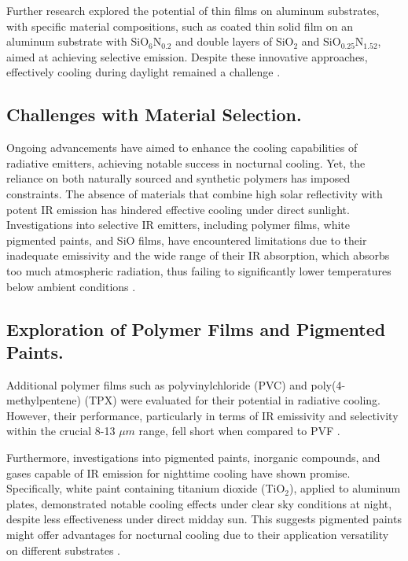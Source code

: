 Further research explored the potential of thin films on aluminum substrates, with specific material compositions, such as coated thin solid film on an aluminum substrate with $\text{SiO}_6\text{N}_{0.2}$ and double layers of $\text{SiO}_2$ and $\text{SiO}_{0.25}\text{N}_{1.52}$, aimed at achieving selective emission. Despite these innovative approaches, effectively cooling during daylight remained a challenge \cite{bijarniya_review_2020}.

\subsection{Challenges with Material Selection.}
Ongoing advancements have aimed to enhance the cooling capabilities of radiative emitters, achieving notable success in nocturnal cooling. Yet, the reliance on both naturally sourced and synthetic polymers has imposed constraints. The absence of materials that combine high solar reflectivity with potent IR emission has hindered effective cooling under direct sunlight. Investigations into selective IR emitters, including polymer films, white pigmented paints, and SiO films, have encountered limitations due to their inadequate emissivity and the wide range of their IR absorption, which absorbs too much atmospheric radiation, thus failing to significantly lower temperatures below ambient conditions \cite{hossain_radiative_2016}.

\subsection{Exploration of Polymer Films and Pigmented Paints.}
Additional polymer films such as polyvinylchloride (PVC) and poly(4-methylpentene) (TPX) were evaluated for their potential in radiative cooling. However, their performance, particularly in terms of IR emissivity and selectivity within the crucial 8-13 $\mu m$ range, fell short when compared to PVF \cite{hossain_radiative_2016}.

Furthermore, investigations into pigmented paints, inorganic compounds, and gases capable of IR emission for nighttime cooling have shown promise. Specifically, white paint containing titanium dioxide (TiO$_2$), applied to aluminum plates, demonstrated notable cooling effects under clear sky conditions at night, despite less effectiveness under direct midday sun. This suggests pigmented paints might offer advantages for nocturnal cooling due to their application versatility on different substrates \cite{hossain_radiative_2016}.

